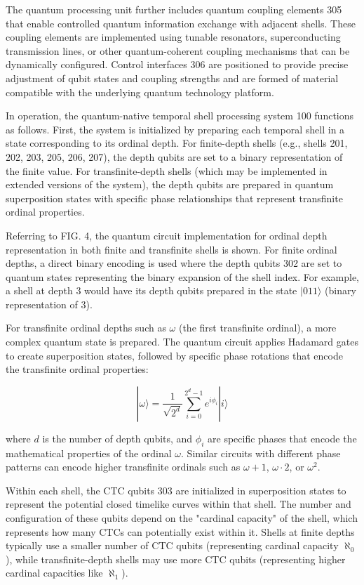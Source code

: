 \documentclass[12pt,letterpaper]{article}
\begin{document}
The quantum processing unit further includes quantum coupling elements 305 that enable controlled quantum information exchange with adjacent shells. These coupling elements are implemented using tunable resonators, superconducting transmission lines, or other quantum-coherent coupling mechanisms that can be dynamically configured. Control interfaces 306 are positioned to provide precise adjustment of qubit states and coupling strengths and are formed of material compatible with the underlying quantum technology platform.

In operation, the quantum-native temporal shell processing system 100 functions as follows. First, the system is initialized by preparing each temporal shell in a state corresponding to its ordinal depth. For finite-depth shells (e.g., shells 201, 202, 203, 205, 206, 207), the depth qubits are set to a binary representation of the finite value. For transfinite-depth shells (which may be implemented in extended versions of the system), the depth qubits are prepared in quantum superposition states with specific phase relationships that represent transfinite ordinal properties.

Referring to FIG. 4, the quantum circuit implementation for ordinal depth representation in both finite and transfinite shells is shown. For finite ordinal depths, a direct binary encoding is used where the depth qubits 302 are set to quantum states representing the binary expansion of the shell index. For example, a shell at depth 3 would have its depth qubits prepared in the state $|011\rangle$ (binary representation of 3).

For transfinite ordinal depths such as $\omega$ (the first transfinite ordinal), a more complex quantum state is prepared. The quantum circuit applies Hadamard gates to create superposition states, followed by specific phase rotations that encode the transfinite ordinal properties:

$$|\omega\rangle = \frac{1}{\sqrt{2^d}}\sum_{i=0}^{2^d-1} e^{i\phi_i}|i\rangle$$

where $d$ is the number of depth qubits, and $\phi_i$ are specific phases that encode the mathematical properties of the ordinal $\omega$. Similar circuits with different phase patterns can encode higher transfinite ordinals such as $\omega+1$, $\omega \cdot 2$, or $\omega^2$.

Within each shell, the CTC qubits 303 are initialized in superposition states to represent the potential closed timelike curves within that shell. The number and configuration of these qubits depend on the "cardinal capacity" of the shell, which represents how many CTCs can potentially exist within it. Shells at finite depths typically use a smaller number of CTC qubits (representing cardinal capacity $\aleph_0$), while transfinite-depth shells may use more CTC qubits (representing higher cardinal capacities like $\aleph_1$).
\end{document}
